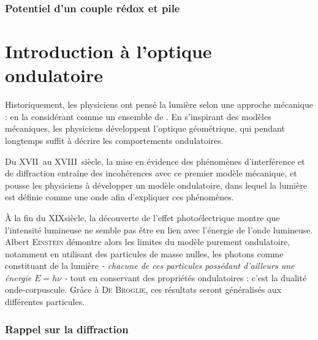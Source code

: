     \subsection{Potentiel d'un couple rédox et pile}
    
    \chapter{Introduction à l'optique ondulatoire}
    
    Historiquement, les physiciens ont pensé la lumière selon une approche mécanique : en la considérant comme un ensemble de . En s'inspirant des modèles mécaniques, les physiciens développent l'optique géométrique, qui pendant longtemps suffit à décrire les comportements ondulatoires.\medskip
    
    Du \textsc{XVII}\ieme~au \textsc{XVIII}\ieme~siècle, la mise en évidence des phénomènes d'interférence et de diffraction entraîne des incohérences avec ce premier modèle mécanique, et pousse les physiciens à développer un modèle ondulatoire, dans lequel la lumière est définie comme une onde afin d'expliquer ces phénomènes.\medskip
    
    À la fin du \textsc{XIX}\ieme siècle, la découverte de l'effet photoélectrique montre que l'intensité lumineuse ne semble pas être en lien avec l'énergie de l'onde lumineuse. Albert \textsc{Einstein} démontre alors les limites du modèle purement ondulatoire, notamment en utilisant des particules de masse nulles, les photons comme constituant de la lumière \emph{- chacune de ces particules possédant d'ailleurs une énergie $E = h\nu$ -} tout en conservant des propriétés ondulatoires : c'est la dualité onde-corpuscule. Grâce à \textsc{De Broglie}, ces résultats seront généralisés aux différentes particules.
    
    \chaptertoc
    
    \subsection{Rappel sur la diffraction}
    
